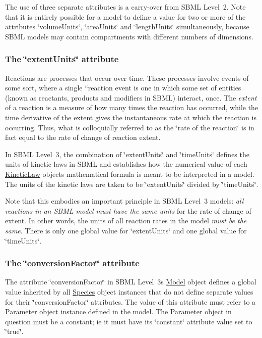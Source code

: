 The use of three separate attributes is a carry-\/over from S\+B\+ML Level~2. Note that it is entirely possible for a model to define a value for two or more of the attributes \char`\"{}volume\+Units\char`\"{}, \char`\"{}area\+Units\char`\"{} and \char`\"{}length\+Units\char`\"{} simultaneously, because S\+B\+ML models may contain compartments with different numbers of dimensions.\hypertarget{class_model_model-l3-extentunits}{}\subsubsection{The \char`\"{}extent\+Units\char`\"{} attribute}\label{class_model_model-l3-extentunits}
Reactions are processes that occur over time. These processes involve events of some sort, where a single ``reaction event\textquotesingle{}\textquotesingle{} is one in which some set of entities (known as reactants, products and modifiers in S\+B\+ML) interact, once. The {\itshape extent} of a reaction is a measure of how many times the reaction has occurred, while the time derivative of the extent gives the instantaneous rate at which the reaction is occurring. Thus, what is colloquially referred to as the \char`\"{}rate of the
   reaction\char`\"{} is in fact equal to the rate of change of reaction extent.

In S\+B\+ML Level~3, the combination of \char`\"{}extent\+Units\char`\"{} and \char`\"{}time\+Units\char`\"{} defines the units of kinetic laws in S\+B\+ML and establishes how the numerical value of each \hyperlink{class_kinetic_law}{Kinetic\+Law} object\textquotesingle{}s mathematical formula is meant to be interpreted in a model. The units of the kinetic laws are taken to be \char`\"{}extent\+Units\char`\"{} divided by \char`\"{}time\+Units\char`\"{}.

Note that this embodies an important principle in S\+B\+ML Level~3 models\+: {\itshape all reactions in an S\+B\+ML model must have the same units} for the rate of change of extent. In other words, the units of all reaction rates in the model {\itshape must be the same}. There is only one global value for \char`\"{}extent\+Units\char`\"{} and one global value for \char`\"{}time\+Units\char`\"{}.\hypertarget{class_model_model-l3-convfactor}{}\subsubsection{The \char`\"{}conversion\+Factor\char`\"{} attribute}\label{class_model_model-l3-convfactor}
The attribute \char`\"{}conversion\+Factor\char`\"{} in S\+B\+ML Level~3\textquotesingle{}s \hyperlink{class_model}{Model} object defines a global value inherited by all \hyperlink{class_species}{Species} object instances that do not define separate values for their \char`\"{}conversion\+Factor\char`\"{} attributes. The value of this attribute must refer to a \hyperlink{class_parameter}{Parameter} object instance defined in the model. The \hyperlink{class_parameter}{Parameter} object in question must be a constant; ie it must have its \char`\"{}constant\char`\"{} attribute value set to {\ttfamily \char`\"{}true\char`\"{}}.

